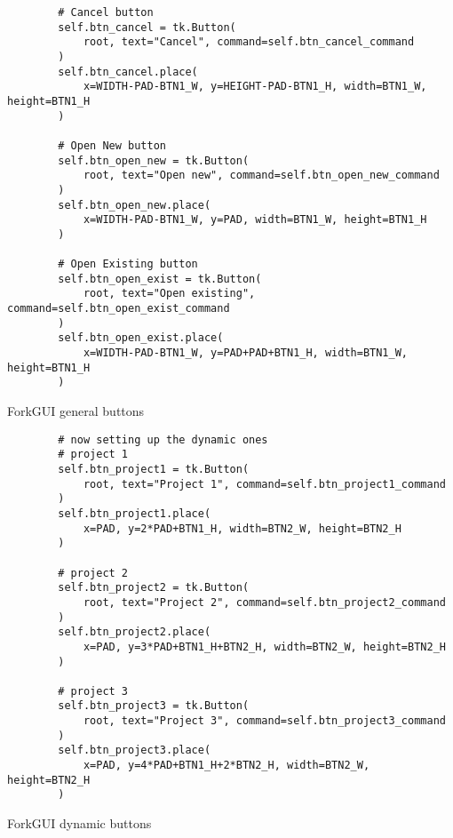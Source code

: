 \newpage
\begin{listing}[!ht]
    \begin{verbatim}
        # Cancel button
        self.btn_cancel = tk.Button(
            root, text="Cancel", command=self.btn_cancel_command
        )
        self.btn_cancel.place(
            x=WIDTH-PAD-BTN1_W, y=HEIGHT-PAD-BTN1_H, width=BTN1_W, height=BTN1_H
        )
        
        # Open New button
        self.btn_open_new = tk.Button(
            root, text="Open new", command=self.btn_open_new_command
        )
        self.btn_open_new.place(
            x=WIDTH-PAD-BTN1_W, y=PAD, width=BTN1_W, height=BTN1_H
        )
        
        # Open Existing button
        self.btn_open_exist = tk.Button(
            root, text="Open existing", command=self.btn_open_exist_command
        )
        self.btn_open_exist.place(
            x=WIDTH-PAD-BTN1_W, y=PAD+PAD+BTN1_H, width=BTN1_W, height=BTN1_H
        )
    \end{verbatim}
    \caption{ForkGUI general buttons}
    \label{sc:fork-gui-general-buttons}
\end{listing}

\newpage
\begin{listing}[!ht]
    \begin{verbatim}
        # now setting up the dynamic ones
        # project 1
        self.btn_project1 = tk.Button(
            root, text="Project 1", command=self.btn_project1_command
        )
        self.btn_project1.place(
            x=PAD, y=2*PAD+BTN1_H, width=BTN2_W, height=BTN2_H
        )
        
        # project 2
        self.btn_project2 = tk.Button(
            root, text="Project 2", command=self.btn_project2_command
        )
        self.btn_project2.place(
            x=PAD, y=3*PAD+BTN1_H+BTN2_H, width=BTN2_W, height=BTN2_H
        )
        
        # project 3
        self.btn_project3 = tk.Button(
            root, text="Project 3", command=self.btn_project3_command
        )
        self.btn_project3.place(
            x=PAD, y=4*PAD+BTN1_H+2*BTN2_H, width=BTN2_W, height=BTN2_H
        )
    \end{verbatim}
    \caption{ForkGUI dynamic buttons}
    \label{sc:fork-gui-dynamic-buttons}
\end{listing}

